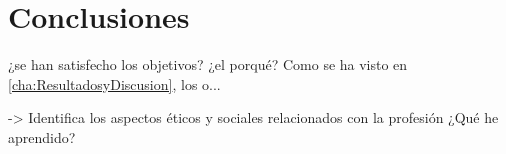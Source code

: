 
\chapter{Conclusiones}
\label{cha:Conclusiones}

    ¿se han satisfecho los objetivos? ¿el porqué? Como se ha visto en \ref{cha:ResultadosyDiscusion}, los o...

    -> Identifica los aspectos éticos y sociales relacionados con la profesión
    ¿Qué he aprendido?

